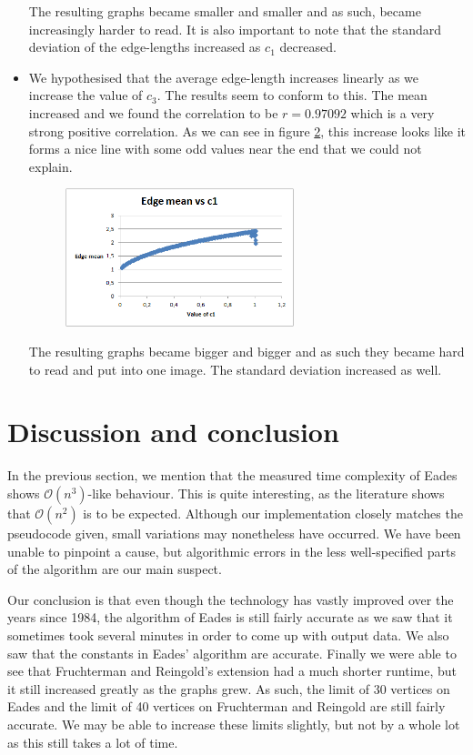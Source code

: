 \documentclass[a4paper,12pt]{article}
\begin{document}
\begin{itemize}
\begin{figure}[h]
	\label{fig:graphc1}
\end{figure}
The resulting graphs became smaller and smaller and as such, became increasingly harder to read. It is also important to note that the standard deviation of the edge-lengths increased as $c_1$ decreased.
\item We hypothesised that the average edge-length increases linearly as we increase the value of $c_3$. The results seem to conform to this. The mean increased and we found the correlation to be $r=0.97092$ which is a very strong positive correlation. As we can see in figure \ref{fig:graphc3}, this increase looks like it forms a nice line with some odd values near the end that we could not explain.
\begin{figure}[h]
	\centering
	\includegraphics[height=4cm]{Edgemeanvsc3}
	\label{fig:graphc3}
\end{figure}
The resulting graphs became bigger and bigger and as such they became hard to read and put into one image. The standard deviation increased as well.
\end{itemize}

\section{Discussion and conclusion}
In the previous section, we mention that the measured time complexity of Eades shows $\mathcal{O}(n^3)$-like behaviour. This is quite interesting, as the literature shows that $\mathcal{O}(n^2)$ is to be expected. Although our implementation closely matches the pseudocode given, small variations may nonetheless have occurred. We have been unable to pinpoint a cause, but algorithmic errors in the less well-specified parts of the algorithm are our main suspect.

Our conclusion is that even though the technology has vastly improved over the years since 1984, the algorithm of Eades is still fairly accurate as we saw that it sometimes took several minutes in order to come up with output data. We also saw that the constants in Eades' algorithm are accurate. Finally we were able to see that Fruchterman and Reingold's extension had a much shorter runtime, but it still increased greatly as the graphs grew. As such, the limit of 30 vertices on Eades and the limit of 40 vertices on Fruchterman and Reingold are still fairly accurate. We may be able to increase these limits slightly, but not by a whole lot as this still takes a lot of time.
\end{document}

